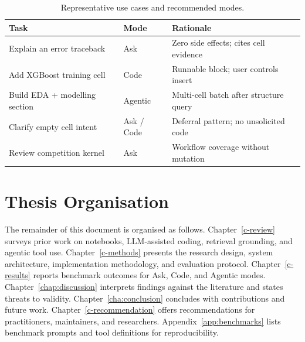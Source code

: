 \begin{table}[!ht]
\centering
\caption{Representative use cases and recommended modes.}
\label{tab:use-cases}
\small
\begin{tabular}{|p{4.2cm}|p{2.4cm}|p{5.8cm}|}
\hline
\textbf{Task} & \textbf{Mode} & \textbf{Rationale} \\ \hline
Explain an error traceback & Ask & Zero side effects; cites cell evidence \\ \hline
Add XGBoost training cell & Code & Runnable block; user controls insert \\ \hline
Build EDA + modelling section & Agentic & Multi-cell batch after structure query \\ \hline
Clarify empty cell intent & Ask / Code & Deferral pattern; no unsolicited code \\ \hline
Review competition kernel & Ask & Workflow coverage without mutation \\ \hline
\end{tabular}
\end{table}

\section{Thesis Organisation}
\label{sec:organisation}

The remainder of this document is organised as follows. Chapter~\ref{c-review} surveys prior work on notebooks, \ac{LLM}-assisted coding, retrieval grounding, and agentic tool use. Chapter~\ref{c-methods} presents the research design, system architecture, implementation methodology, and evaluation protocol. Chapter~\ref{c-results} reports benchmark outcomes for Ask, Code, and Agentic modes. Chapter~\ref{chap:discussion} interprets findings against the literature and states threats to validity. Chapter~\ref{cha:conclusion} concludes with contributions and future work. Chapter~\ref{c-recommendation} offers recommendations for practitioners, maintainers, and researchers. Appendix~\ref{app:benchmarks} lists benchmark prompts and tool definitions for reproducibility.
